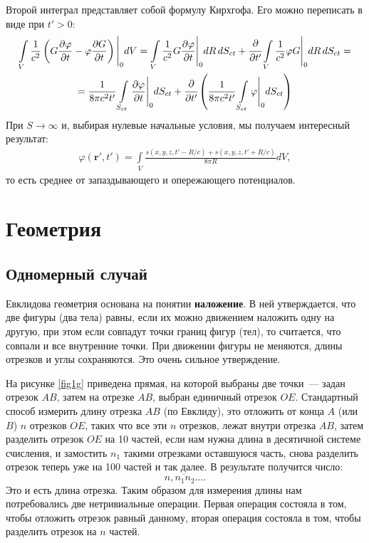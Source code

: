 \documentclass[a4paper,14pt]{extreport} %
\newcommand{\df}[1]{\cfrac{\partial}{\partial #1}}
\newcommand{\dff}[2]{\frac{\partial #1}{\partial #2}}
\renewcommand{\vec}[1]{\boldsymbol{#1}}
\begin{document}
	Второй интеграл представляет собой формулу Кирхгофа. Его можно переписать в виде при $t'>0$:
	\begin{gather*}
		\int\limits_V\frac{1}{c^2} \left(G \dff{\varphi}{t} - \varphi \dff{G}{t} \right) \Bigg|_0 dV = 
		\int\limits_V\frac{1}{c^2} G \dff{\varphi}{t}\Bigg|_0 dR\,dS_{ct} +
		\df{t'}\int\limits_V\frac{1}{c^2}\varphi G \Bigg|_0 dR\,dS_{ct} = 
		\\
		=
		 \frac{1}{8\pi c^2 t'} \int\limits_{S_{ct}} \dff{\varphi}{t}\Bigg|_0 dS_{ct} +
		\df{t'}\left( \frac{1}{8\pi c^2 t'}  \int\limits_{S_{ct}} \varphi\Bigg|_0 dS_{ct}\right)
	\end{gather*}
	При $S \to \infty$ и, выбирая нулевые начальные условия, мы получаем интересный результат:
	\begin{gather*}
		\varphi(\vec{r}', t') = 
		\int\limits_V \frac{s(x, y, z, t' - R/c) + s(x, y, z, t' + R/c)}{8\pi R} dV,
	\end{gather*}
	то есть среднее от запаздывающего и опережающего потенциалов.
	
	\chapter{Геометрия}
	
	\section{Одномерный случай}
	
	Евклидова геометрия основана на понятии \textbf{наложение}. В ней утверждается, что две фигуры (два тела) равны, если их можно движением наложить одну на другую, при этом если совпадут точки границ фигур (тел), то считается, что совпали и все внутренние точки. При движении фигуры не меняются, длины отрезков и углы сохраняются. Это очень сильное утверждение. 
	
	На рисунке \ref{fig1g} приведена прямая, на которой выбраны две точки~--- задан отрезок $AB$, затем на отрезке $AB$, выбран единичный отрезок $OE$. Стандартный способ измерить длину отрезка $AB$ (по Евклиду), это отложить от конца $A$ (или $B$) $n$ отрезков $OE$, таких что все эти $n$ отрезков, лежат внутри отрезка $AB$, затем разделить отрезок $OE$ на 10 частей, если нам нужна длина в десятичной системе счисления, и замостить $n_1$ такими отрезками оставшуюся часть, снова разделить отрезок теперь уже на 100 частей и так далее. В результате получится число:
	\[
		\overline{n{,}n_1n_2\ldots}.
	\]
	Это и есть длина отрезка. Таким образом для измерения длины нам потребовались две нетривиальные операции. Первая операция состояла в том, чтобы отложить отрезок равный данному, вторая операция состояла в том, чтобы разделить отрезок на $n$ частей.
	
\end{document}
